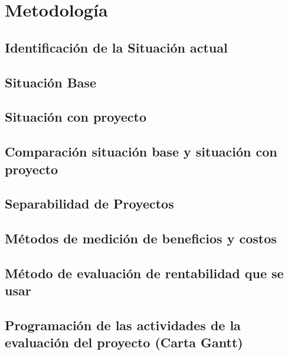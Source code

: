\section{Metodología}
	\subsection{Identificación de la Situación actual}
	\subsection{Situación Base}
	\subsection{Situación con proyecto}
	\subsection{Comparación situación base y situación con proyecto}
	\subsection{Separabilidad de Proyectos}
	\subsection{Métodos de medición de beneficios y costos}
	\subsection{Método de evaluación de rentabilidad que se usar}
	\subsection{Programación de las actividades de la evaluación del proyecto (Carta Gantt)}

